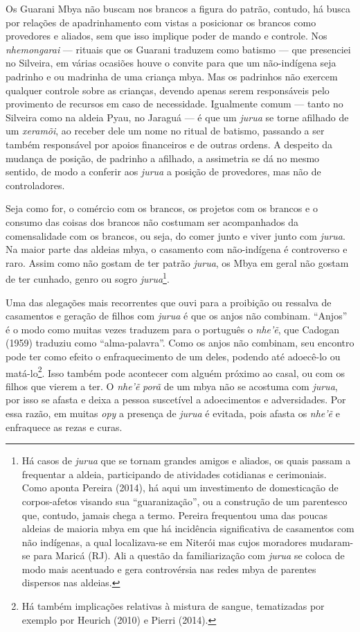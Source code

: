 Os Guarani Mbya não buscam nos brancos a figura do patrão, contudo, há
busca por relações de apadrinhamento com vistas a posicionar os brancos
como provedores e aliados, sem que isso implique poder de mando e
controle. Nos \emph{nhemongarai} --- rituais que os Guarani traduzem
como batismo --- que presenciei no Silveira, em várias ocasiões houve o
convite para que um não-indígena seja padrinho e ou madrinha de uma
criança mbya. Mas os padrinhos não exercem qualquer controle sobre as
crianças, devendo apenas serem responsáveis pelo provimento de recursos
em caso de necessidade. Igualmente comum --- tanto no Silveira como na
aldeia Pyau, no Jaraguá --- é que um \emph{jurua} se torne afilhado de
um \emph{xeramõi}, ao receber dele um nome no ritual de batismo,
passando a ser também responsável por apoios financeiros e de outras
ordens. A despeito da mudança de posição, de padrinho a afilhado, a
assimetria se dá no mesmo sentido, de modo a conferir aos \emph{jurua} a
posição de provedores, mas não de controladores.

Seja como for, o comércio com os brancos, os projetos com os brancos e o
consumo das coisas dos brancos não costumam ser acompanhados da
comensalidade com os brancos, ou seja, do comer junto e viver junto com
\emph{jurua}. Na maior parte das aldeias mbya, o casamento com
não-indígena é controverso e raro. Assim como não gostam de ter patrão
\emph{jurua}, os Mbya em geral não gostam de ter cunhado, genro ou sogro
\emph{jurua}\footnote{Há casos de \emph{jurua} que se tornam grandes
  amigos e aliados, os quais passam a frequentar a aldeia, participando
  de atividades cotidianas e cerimoniais. Como aponta Pereira (2014), há
  aqui um investimento de domesticação de corpos-afetos visando sua
  ``guaranização'', ou a construção de um parentesco que, contudo,
  jamais chega a termo. Pereira frequentou uma das poucas aldeias de
  maioria mbya em que há incidência significativa de casamentos com não
  indígenas, a qual localizava-se em Niterói mas cujos moradores
  mudaram-se para Maricá (RJ). Ali a questão da familiarização com
  \emph{jurua} se coloca de modo mais acentuado e gera controvérsia nas
  redes mbya de parentes dispersos nas aldeias.}.

Uma das alegações mais recorrentes que ouvi para a proibição ou ressalva
de casamentos e geração de filhos com \emph{jurua} é que os anjos não
combinam. ``Anjos'' é o modo como muitas vezes traduzem para o português
o \emph{nhe'ẽ}, que Cadogan (1959) traduziu como ``alma-palavra''. Como
os anjos não combinam, seu encontro pode ter como efeito o
enfraquecimento de um deles, podendo até adoecê-lo ou matá-lo\footnote{Há
  também implicações relativas à mistura de sangue, tematizadas por
  exemplo por Heurich (2010) e Pierri (2014).}. Isso também pode
acontecer com alguém próximo ao casal, ou com os filhos que vierem a
ter. O \emph{nhe'ẽ} \emph{porã} de um mbya não se acostuma com
\emph{jurua}, por isso se afasta e deixa a pessoa suscetível a
adoecimentos e adversidades. Por essa razão, em muitas \emph{opy} a
presença de \emph{jurua} é evitada, pois afasta os \emph{nhe'ẽ} e
enfraquece as rezas e curas.

